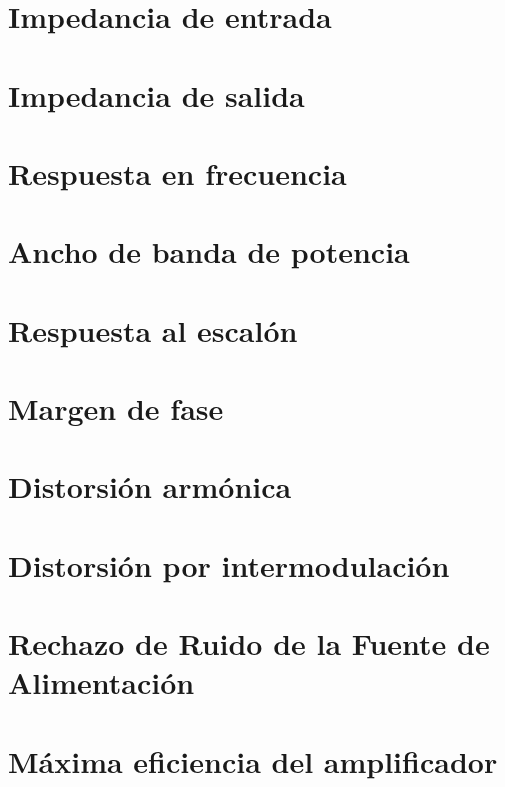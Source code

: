 \documentclass[10pt,a4paper]{article}
\begin{document}
		\section{Impedancia de entrada}{\label{sec:sim_zi}
			

		\section{Impedancia de salida}\label{sec:sim_zo}
			

		\section{Respuesta en frecuencia}\label{sec:sim_rta_frec}
			

		\section{Ancho de banda de potencia}\label{sec:sim_bw}
			

		\section{Respuesta al escalón}\label{sec:sim_escalon}
			
	
		\section{Margen de fase}\label{sec:sim_fase}
			

		\section{Distorsión armónica}\label{sec:sim_thd}
			
		
		\section{Distorsión por intermodulación}\label{sec:sim_intermod}
			

		\section{Rechazo de Ruido de la Fuente de Alimentación}\label{sec:sim_psnr}
			

		\section{Máxima eficiencia del amplificador}\label{sec:max_ef}
			

}
\end{document}
